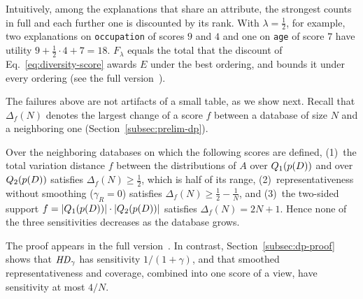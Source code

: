 Intuitively, among the explanations that share an attribute, the strongest counts in full and each further one is discounted by its rank.
With $\lambda=\tfrac12$, for example, two explanations on \texttt{occupation} of scores $9$ and $4$ and one on \texttt{age} of score $7$ have utility $9+\tfrac12\cdot4+7=18$.
$F_\lambda$ equals the total that the discount of Eq.~\eqref{eq:diversity-score} awards $E$ under the best ordering, and bounds it under every ordering (see \ifpaper the full version~\cite{fullversion}\else {}\fi).

The failures above are not artifacts of a small table, as we show next.
Recall that $\Delta_f(N)$ denotes the largest change of a score $f$ between a database of size $N$ and a neighboring one (Section~\ref{subsec:prelim-dp}).

\begin{proposition}
\label{prop:sensitivity-itemized}
Over the neighboring databases on which the following scores are defined, (1)~the total variation distance $f$ between the distributions of $A$ over $Q_1(p(D))$ and over $Q_2(p(D))$ satisfies $\Delta_f(N)\ge\frac12$, which is half of its range, (2)~representativeness without smoothing ($\gamma_R=0$) satisfies $\Delta_f(N)\ge\frac12-\frac1N$, and (3)~the two-sided support $f=|Q_1(p(D))|\cdot|Q_2(p(D))|$ satisfies $\Delta_f(N)=2N+1$.
Hence none of the three sensitivities decreases as the database grows.
\end{proposition}

The proof appears in \ifpaper the full version~\cite{fullversion}\else {}\fi.
In contrast, Section~\ref{subsec:dp-proof} shows that $\mathit{HD}_\gamma$ has sensitivity $1/(1+\gamma)$, and that smoothed representativeness and coverage, combined into one score of a view, have sensitivity at most $4/N$.
